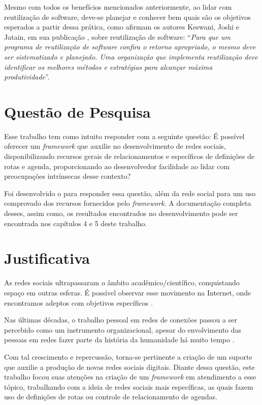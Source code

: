 Mesmo com todos os benefícios mencionados anteriormente, ao lidar com reutilização de software, deve-se planejar e conhecer bem quais são os objetivos esperados a partir dessa prática, como afirmam os autores Keswani, Joshi e Jatain, em sua publicação  \cite{Keswani:Joshi:Jatain:2014}, sobre reutilização de software: ``\textit{Para que um programa de reutilização de software confira o retorno apropriado, o mesmo deve ser sistematizado e planejado. Uma organização que implementa reutilização deve identificar os melhores métodos e estratégias para alcançar máxima produtividade}''.

\section{Questão de Pesquisa}

Esse trabalho tem como intuito responder com a seguinte questão: É possível oferecer um \textit{framework} que auxilie no desenvolvimento de redes sociais, disponibilizando recursos gerais de relacionamentos e específicos de definições de rotas e agenda, proporcionando ao desenvolvedor facilidade ao lidar com preocupações intrínsecas desse contexto?

Foi desenvolvido o  para responder essa questão, além da rede social  para um uso comprovado dos recursos fornecidos pelo \textit{framework}. A documentação completa desses, assim como, os resultados encontrados no desenvolvimento pode ser encontrada nos capítulos 4 e 5 deste trabalho.

\section{Justificativa}

As redes sociais ultrapassaram o âmbito acadêmico/científico, conquistando espaço em outras esferas. É possível observar esse movimento na Internet, onde encontramos adeptos com objetivos específicos \cite{Tomae:Alcara:Chiara:2005}.

Nas últimas décadas, o trabalho pessoal em redes de conexões passou a ser percebido como um instrumento organizacional, apesar do envolvimento das pessoas em redes fazer parte da história da humanidade há muito tempo \cite{Tomae:Alcara:Chiara:2005}.

Com tal crescimento e repercussão, torna-se pertinente a criação de um suporte que auxilie a produção de novas redes sociais digitais. Diante dessa questão, este trabalho focou suas atenções na criação de um \textit{framework} em atendimento a esse tópico, trabalhando com a ideia de redes sociais mais específicas, as quais fazem uso de definições de rotas ou controle de relacionamento de agendas.

